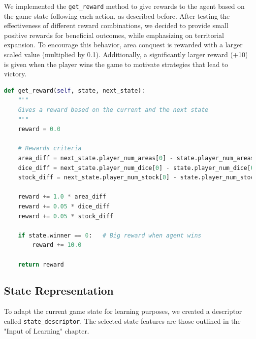 \documentclass{article}
\begin{document}
We implemented the \texttt{get\_reward} method to give rewards to the agent based on the game state following each action, as described before. After testing the effectiveness of different reward combinations, we decided to provide small positive rewards for beneficial outcomes, while emphasizing on territorial expansion. To encourage this behavior, area conquest is rewarded with a larger scaled value (multiplied by 0.1). Additionally, a significantly larger reward (+10) is given when the player wins the game to motivate strategies that lead to victory.
\\
\begin{lstlisting}[language=Python, caption={Reward function}, label={lst:reward_func}]
def get_reward(self, state, next_state):
    """
    Gives a reward based on the current and the next state
    """
    reward = 0.0

    # Rewards criteria
    area_diff = next_state.player_num_areas[0] - state.player_num_areas[0]  # number of areas 
    dice_diff = next_state.player_num_dice[0] - state.player_num_dice[0]    # number of dice 
    stock_diff = next_state.player_num_stock[0] - state.player_num_stock[0] # number of stock dice

    reward += 1.0 * area_diff
    reward += 0.05 * dice_diff
    reward += 0.05 * stock_diff

    if state.winner == 0:   # Big reward when agent wins
        reward += 10.0

    return reward
\end{lstlisting}

\subsection{State Representation}

To adapt the current game state for learning purposes, we created a descriptor called \texttt{state\_descriptor}. The selected state features are those outlined in the "Input of Learning" chapter. 
\end{document}
